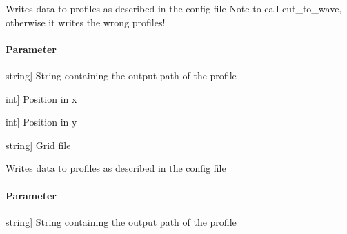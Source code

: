 \documentclass[letterpaper,10pt,english]{sphinxmanual}
\begin{document}
\begin{fulllineitems}
\begin{fulllineitems}
\end{fulllineitems}


\begin{fulllineitems}
\label{\detokenize{classes:id57}}
\pysigstartsignatures
{}
\pysigstopsignatures
\sphinxAtStartPar
Writes data to profiles as described in the config file
Note to call cut\_to\_wave, otherwise it writes the wrong profiles!


\paragraph{Parameter}
\label{\detokenize{classes:id58}}\begin{description}
\sphinxlineitem{filename}{[}string{]}
\sphinxAtStartPar
String containing the output path of the profile

\sphinxlineitem{x}{[}int{]}
\sphinxAtStartPar
Position in x

\sphinxlineitem{y}{[}int{]}
\sphinxAtStartPar
Position in y

\sphinxlineitem{Grid}{[}string{]}
\sphinxAtStartPar
Grid file

\end{description}

\end{fulllineitems}


\begin{fulllineitems}
\label{\detokenize{classes:id59}}
\pysigstartsignatures
{}
\pysigstopsignatures
\sphinxAtStartPar
Writes data to profiles as described in the config file


\paragraph{Parameter}
\label{\detokenize{classes:id60}}\begin{description}
\sphinxlineitem{filename}{[}string{]}
\sphinxAtStartPar
String containing the output path of the profile


\end{description}
\end{fulllineitems}
\end{fulllineitems}
\end{document}
